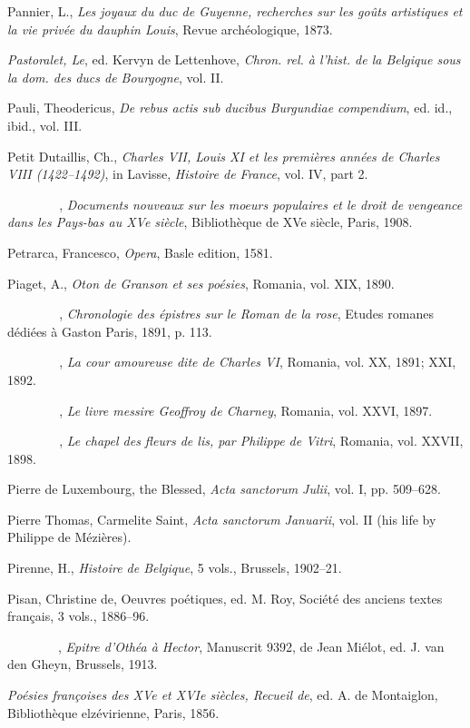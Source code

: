 Pannier, L., \emph{Les joyaux du duc de Guyenne, recherches sur les
goûts artistiques et la vie privée du dauphin Louis}, Revue
archéologique, 1873.

\emph{Pastoralet, Le}, ed. Kervyn de Lettenhove, \emph{Chron. rel. à
l'hist. de la Belgique sous la dom. des ducs de Bourgogne}, vol. II.

Pauli, Theodericus, \emph{De rebus actis sub ducibus Burgundiae
compendium}, ed. id., ibid., vol. III.

Petit Dutaillis, Ch., \emph{Charles VII, Louis XI et les premières
années de Charles VIII (1422--1492)}, in Lavisse, \emph{Histoire de
France}, vol. IV, part 2.

\emph{{~~~~~~~~}}, \emph{Documents nouveaux sur les moeurs populaires et
le droit de vengeance dans les Pays-bas au XVe siècle}, Bibliothèque de
XVe siècle, Paris, 1908.

Petrarca, Francesco, \emph{Opera}, Basle edition, 1581.

Piaget, A., \emph{Oton de Granson et ses poésies}, Romania, vol. XIX,
1890.

\emph{{~~~~~~~~}}, \emph{Chronologie des épistres sur le Roman de la
rose}, Etudes romanes dédiées à Gaston Paris, 1891, p. 113.

\emph{{~~~~~~~~}}, \emph{La cour amoureuse dite de Charles VI}, Romania,
vol. XX, 1891; XXI, 1892.

\emph{{~~~~~~~~}}, \emph{Le livre messire Geoffroy de Charney}, Romania,
vol. XXVI, 1897.

\emph{{~~~~~~~~}}, \emph{Le chapel des fleurs de lis, par Philippe de
Vitri}, Romania, vol. XXVII, 1898.

\protect\hypertarget{24_BIBLIOGRAPHY.xhtmlux5cux23page_448}{}{}Pierre de
Luxembourg, the Blessed, \emph{Acta sanctorum Julii}, vol. I, pp.
509--628.

Pierre Thomas, Carmelite Saint, \emph{Acta sanctorum Januarii}, vol. II
(his life by Philippe de Mézières).

Pirenne, H., \emph{Histoire de Belgique}, 5 vols., Brussels, 1902--21.

Pisan, Christine de, Oeuvres poétiques, ed. M. Roy, Société des anciens
textes français, 3 vols., 1886--96.

{~~~~~~~~}, \emph{Epitre d'Othéa à Hector}, Manuscrit 9392, de Jean
Miélot, ed. J. van den Gheyn, Brussels, 1913.

\emph{Poésies françoises des XVe et XVIe siècles, Recueil de}, ed. A. de
Montaiglon, Bibliothèque elzévirienne, Paris, 1856.

